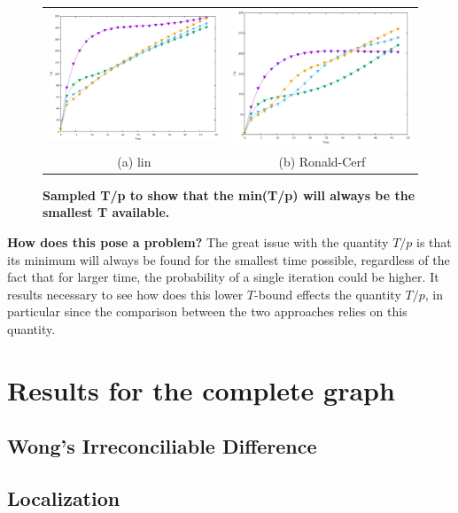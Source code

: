 \begin{figure}[!ht]
\centering
\begin{tabular}{cc}
  \includegraphics[width=75mm]{../figures/sampled_t_over_p/T_p_lin.pdf} &   \includegraphics[width=75mm]{../figures/sampled_t_over_p/T_p_cerf.pdf} \\
(a) lin & (b) Ronald-Cerf\\[6pt]
\end{tabular}
\caption[Sampled T/p ]{\textbf{Sampled T/p to show that the min(T/p) will always be the smallest T available.}}
\end{figure}

\textbf{How does this pose a problem?} The great issue with the quantity $T/p$ is that its minimum will always be found for the smallest time possible, regardless of the fact that for larger time, the probability of a single iteration could be higher. It results necessary to see how does this lower $T$-bound effects the quantity $T/p$, in particular since the comparison between the two approaches relies on this quantity.

\section{Results for the complete graph}
\subsection{Wong's Irreconciliable Difference }
\subsection{Localization}
